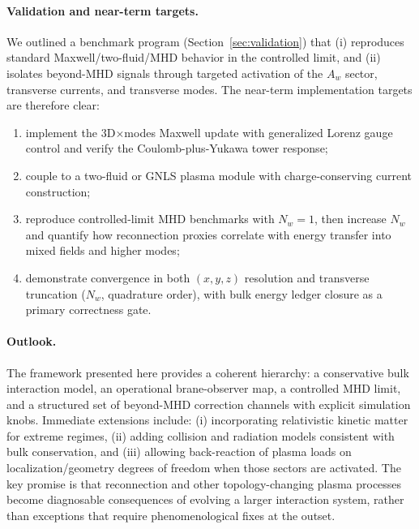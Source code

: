 \documentclass[11pt]{article}
\begin{document}
\paragraph{Validation and near-term targets.}
We outlined a benchmark program (Section~\ref{sec:validation}) that (i) reproduces standard
Maxwell/two-fluid/MHD behavior in the controlled limit, and (ii) isolates beyond-MHD signals
through targeted activation of the \(A_w\) sector, transverse currents, and transverse modes.
The near-term implementation targets are therefore clear:
\begin{enumerate}[leftmargin=1.6em]
\item implement the 3D\(\times\)modes Maxwell update with generalized Lorenz gauge control and
verify the Coulomb-plus-Yukawa tower response;
\item couple to a two-fluid or GNLS plasma module with charge-conserving current construction;
\item reproduce controlled-limit MHD benchmarks with \(N_w=1\), then increase \(N_w\) and quantify
how reconnection proxies correlate with energy transfer into mixed fields and higher modes;
\item demonstrate convergence in both \((x,y,z)\) resolution and transverse truncation (\(N_w\),
quadrature order), with bulk energy ledger closure as a primary correctness gate.
\end{enumerate}

\paragraph{Outlook.}
The framework presented here provides a coherent hierarchy: a conservative bulk interaction
model, an operational brane-observer map, a controlled MHD limit, and a structured set of
beyond-MHD correction channels with explicit simulation knobs. Immediate extensions include:
(i) incorporating relativistic kinetic matter for extreme regimes, (ii) adding collision and
radiation models consistent with bulk conservation, and (iii) allowing back-reaction of plasma
loads on localization/geometry degrees of freedom when those sectors are activated. The key
promise is that reconnection and other topology-changing plasma processes become diagnosable
consequences of evolving a larger interaction system, rather than exceptions that require
phenomenological fixes at the outset.

\appendix
\end{document}
